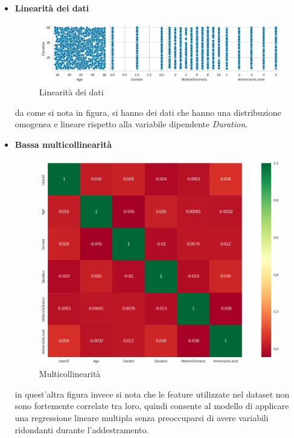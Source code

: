 \par{
\begin{itemize}
    \item \textbf{Linearità dei dati}
    \begin{figure}[H]
        \centering
        \includegraphics[width=1\linewidth]{image.png}
        \caption{Linearità dei dati}
        \label{fig:enter-label}
    \end{figure}
    da come si nota in figura, si hanno dei dati che hanno una distribuzione omogenea e lineare rispetto alla variabile dipendente \textit{Duration}.
    \item \textbf{Bassa multicollinearità}
    \begin{figure}[H]
        \centering
        \includegraphics[width=1\linewidth]{multicoll.png}
        \caption{Multicollinearità}
        \label{fig:enter-label}
    \end{figure}
    in quest'altra figura invece si nota che le feature utilizzate nel dataset non sono fortemente correlate tra loro, quindi consente al modello di applicare una regressione lineare multipla senza preoccuparsi di avere variabili ridondanti durante l'addestramento.
\end{itemize}
}

